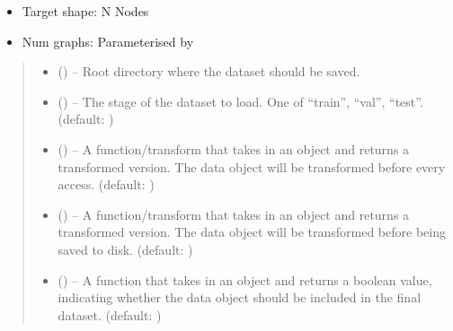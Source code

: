 \documentclass[letterpaper,10pt,english]{sphinxhowto}
\begin{document}
\begin{fulllineitems}
\begin{itemize}
\item {} 
\sphinxAtStartPar
Target shape: N Nodes

\item {} 
\sphinxAtStartPar
Num graphs: Parameterised by 

\end{itemize}
\begin{quote}\begin{description}
\begin{itemize}
\item {} 
\sphinxAtStartPar
{} () – Root directory where the dataset should be saved.

\item {} 
\sphinxAtStartPar
{} () – The stage of the dataset to load. One of “train”, “val”, “test”. (default: )

\item {} 
\sphinxAtStartPar
{} (\sphinxstyleliteralemphasis{\sphinxupquote{, }}) – A function/transform that takes in an  object and returns a transformed version. The data object will be transformed before every access. (default: )

\item {} 
\sphinxAtStartPar
{} (\sphinxstyleliteralemphasis{\sphinxupquote{, }}) – A function/transform that takes in an  object and returns a transformed version. The data object will be transformed before being saved to disk. (default: )

\item {} 
\sphinxAtStartPar
{} (\sphinxstyleliteralemphasis{\sphinxupquote{, }}) – A function that takes in an  object and returns a boolean value, indicating whether the data object should be included in the final dataset. (default: )


\end{itemize}
\end{description}
\end{quote}
\end{fulllineitems}
\end{document}
